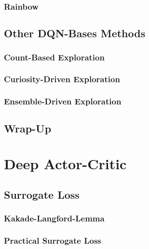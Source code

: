 		\subsection{Rainbow} %

	\section{Other DQN-Bases Methods} %

		\subsection{Count-Based Exploration} %

		\subsection{Curiosity-Driven Exploration} %

		\subsection{Ensemble-Driven Exploration} %

	\section{Wrap-Up} %

\chapter{Deep Actor-Critic} %

	\section{Surrogate Loss} %

		\subsection{Kakade-Langford-Lemma} %

		\subsection{Practical Surrogate Loss} %

